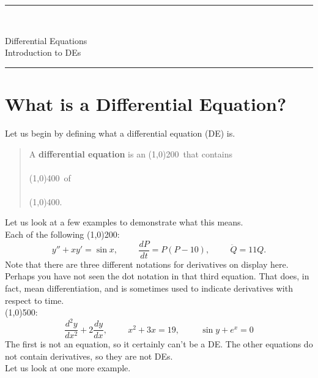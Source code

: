 \documentclass[12pt]{article}
\newcommand{\<}{\langle}
\renewcommand{\>}{\rangle}
\begin{document}
\noindent\rule{7in}{0.4pt}\\
\begin{center}
{\sc 
Differential Equations\\
Introduction to DEs	\\
}
\end{center}
\noindent\rule{7in}{0.4pt}
\section*{What is a Differential Equation?}

\doublespacing
\noindent  Let us begin by defining what a differential equation (DE) is.
	\begin{quote}
	A {\bf differential equation} is an %
	\line(1,0){200}\, that contains \\ \\ %
	\line(1,0){400}\, of \\ \\%
	\line(1,0){400}.
	\end{quote}
\singlespacing
\noindent  Let us look at a few examples to demonstrate what this means.\\

\noindent  Each of the following \line(1,0){200}: %
	\[ y'' + xy' = \sin x, \hspace{1cm}  \frac{dP}{dt} = P(P-10), \hspace{1cm} \ddot{Q} = 11Q. \]
\noindent  Note that there are three different notations for derivatives on display here.  Perhaps you
have not seen the dot notation in that third equation.  That does, in fact, mean differentiation, and
is sometimes used to indicate derivatives with respect to time.\\

\noindent  \line(1,0){500}:%
	\[ \frac{d^2 y}{dx^2} + 2\frac{dy}{dx}, \hspace{1cm} x^2 + 3x = 19, \hspace{1cm} \sin y + e^x = 0\]
\noindent  The first is not an equation, so it certainly can't be a DE.  The other equations do not contain
derivatives, so they are not DEs.\\

\noindent   Let us look at one more example.
\end{document}
